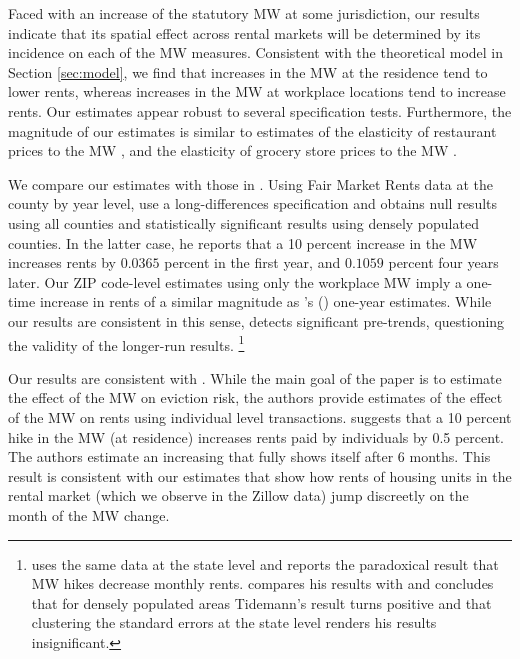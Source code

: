 Faced with an increase of the statutory MW at some jurisdiction, our results
indicate that its spatial effect across rental markets will be determined by 
its incidence on each of the MW measures.
Consistent with the theoretical model in Section \ref{sec:model}, we find that 
increases in the MW at the residence tend to lower rents, whereas increases 
in the MW at workplace locations tend to increase rents.
Our estimates appear robust to several specification tests.
Furthermore, the magnitude of our estimates is similar to estimates of the
elasticity of restaurant prices to the MW \parencite{AllegrettoReich2018},
and the elasticity of grocery store prices to the MW 
\parencite{RenkinEtAl2020, Leung2021}.

We compare our estimates with those in \textcite{Yamagishi2019, AgarwalEtAl2021}.
Using Fair Market Rents data at the county by year level, 
\textcite[][, Tables 1 and 2]{Yamagishi2019} use a long-differences 
specification and obtains null results using all counties and statistically 
significant results using densely populated counties.
In the latter case, he reports that a 10 percent increase in the MW increases
rents by $0.0365$ percent in the first year, and $0.1059$ percent four years 
later.
Our ZIP code-level estimates using only the workplace MW imply a one-time 
increase in rents of a similar magnitude as \citeauthor{Yamagishi2019}'s 
(\citeyear[][Table 2, Column 1]{Yamagishi2019}) one-year estimates.
While our results are consistent in this sense, 
\parencite[][table 3]{Yamagishi2019} detects significant pre-trends,
questioning the validity of the longer-run results.%
\footnote{\textcite{Tidemann2018} uses the same data at the state level and 
reports the paradoxical result that MW hikes decrease monthly rents.
\textcite[][, Appendix C.1.3.]{Yamagishi2019} compares his results with 
\textcite{Tidemann2018} and concludes that for densely populated areas 
Tidemann's result turns positive and that clustering the standard errors at the
state level renders his results insignificant.}

Our results are consistent with \textcite{AgarwalEtAl2021}.
While the main goal of the paper is to estimate the effect of the MW on eviction
risk, the authors provide estimates of the effect of the MW on rents using
individual level transactions.
\textcite[][, Figure 4]{AgarwalEtAl2021} suggests that a 10 percent hike 
in the MW (at residence) increases rents paid by individuals by 0.5 percent.
The authors estimate an increasing that fully shows itself after 6 months.
This result is consistent with our estimates that show how rents of housing 
units in the rental market (which we observe in the Zillow data) jump 
discreetly on the month of the MW change.

